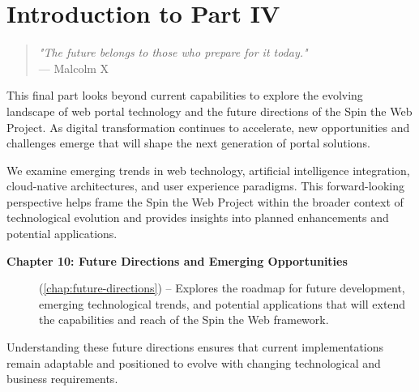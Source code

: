 
\chapter*{Introduction to Part IV}
\label{part:future}

\begin{quote}
\textit{"The future belongs to those who prepare for it today."} \\
— Malcolm X
\end{quote}

This final part looks beyond current capabilities to explore the evolving landscape of web portal technology and the future directions of the Spin the Web Project. As digital transformation continues to accelerate, new opportunities and challenges emerge that will shape the next generation of portal solutions.

We examine emerging trends in web technology, artificial intelligence integration, cloud-native architectures, and user experience paradigms. This forward-looking perspective helps frame the Spin the Web Project within the broader context of technological evolution and provides insights into planned enhancements and potential applications.

\begin{description}
\item[\textbf{Chapter 10: Future Directions and Emerging Opportunities}] (\cref{chap:future-directions}) -- Explores the roadmap for future development, emerging technological trends, and potential applications that will extend the capabilities and reach of the Spin the Web framework.
\end{description}

Understanding these future directions ensures that current implementations remain adaptable and positioned to evolve with changing technological and business requirements.

